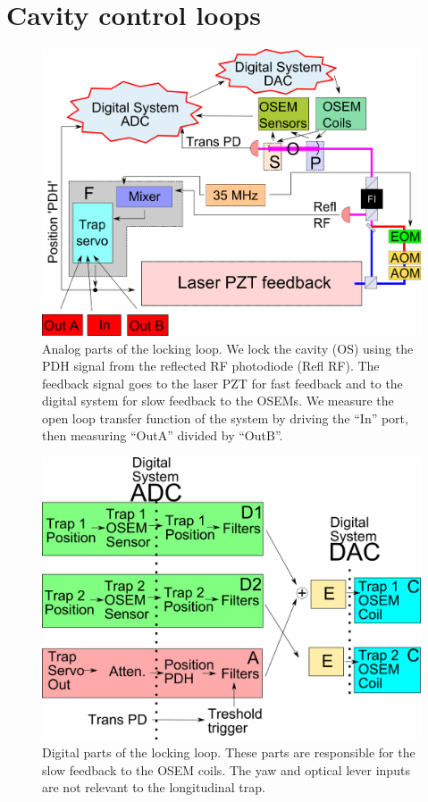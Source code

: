 \section{Cavity control loops}

\begin{figure}[htp]
\includegraphics[width=475pt,angle=270]{figures/controls/traplockSimple.png}%
\caption{Analog parts of the locking loop. We lock the cavity (OS) using the PDH signal from the reflected RF photodiode (Refl RF). The feedback signal goes to the laser PZT for fast feedback and to the digital system for slow feedback to the OSEMs. We measure the open loop transfer function of the system by driving the ``In'' port, then measuring ``OutA'' divided by ``OutB''.}
\label{fig:traplock}%
\end{figure}

\begin{figure}[htp]
\includegraphics[width=\columnwidth]{figures/controls/traplockdig.png}%
\caption[Digital loops]{Digital parts of the locking loop. These parts are responsible for the slow feedback to the OSEM coils. The yaw and optical lever inputs are not relevant to the longitudinal trap.}%
\label{fig:traplockdig}%
\end{figure}


